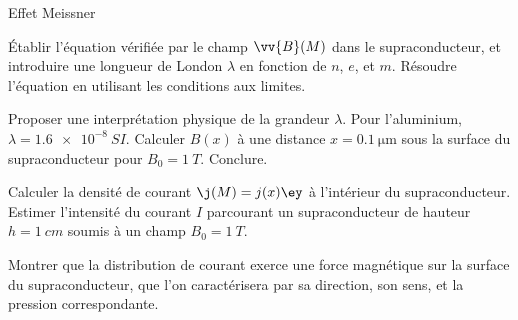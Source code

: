 \begin{exo}[PC][2][TD]{Effet Meissner}
\begin{quest}
\item Établir l'équation vérifiée par le champ $\vv{B}(M)$ dans le supraconducteur, et introduire une longueur de London $\lambda$ en fonction de $n$, $e$, et $m$. Résoudre l'équation en utilisant les conditions aux limites.
\item Proposer une interprétation physique de la grandeur $\lambda$. Pour l'aluminium, $\lambda=\SI{1,6e-8}{SI}$. Calculer $B(x)$ à une distance $x=\SI{0,1}{\micro\meter}$ sous la surface du supraconducteur pour $B_0=\SI{1}{T}$. Conclure.
\item Calculer la densité de courant $\j(M)=j(x) \ey$ à l'intérieur du supraconducteur. Estimer l'intensité du courant $I$ parcourant un supraconducteur de hauteur $h = \SI{1}{cm}$ soumis à un champ $B_0 = \SI{1}{T}$.
\item Montrer que la distribution de courant exerce une force magnétique sur la surface du supraconducteur, que l'on caractérisera par sa direction, son sens, et la pression correspondante. 
\end{quest}
\end{exo}



